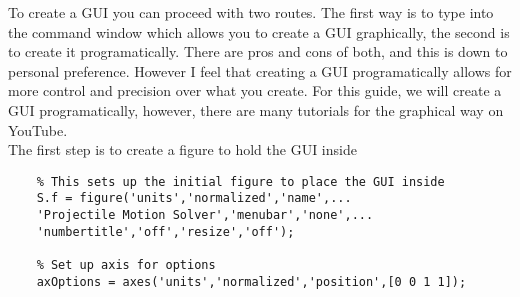 \documentclass[12pt]{report}
\begin{document}
\noindent To create a GUI you can proceed with two routes. The first way is to type  into the command window which allows you to create a GUI graphically, the second is to create it programatically. There are pros and cons of both, and this is down to personal preference. However I feel that creating a GUI programatically allows for more control and precision over what you create. For this guide, we will create a GUI programatically, however, there are many tutorials for the graphical way on YouTube.\\

\noindent The first step is to create a figure to hold the GUI inside
\begin{lstlisting}
    % This sets up the initial figure to place the GUI inside
    S.f = figure('units','normalized','name',...
    'Projectile Motion Solver','menubar','none',...
    'numbertitle','off','resize','off');
    
    % Set up axis for options
    axOptions = axes('units','normalized','position',[0 0 1 1]);
\end{lstlisting}
\end{document}
